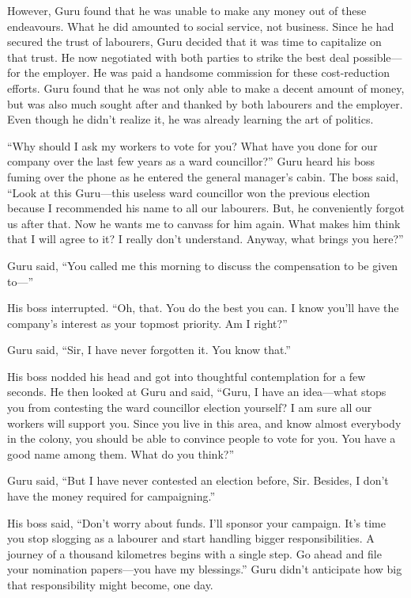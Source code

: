 However, Guru found that he was unable to make any money out of these endeavours.
What he did amounted to social service, not business. Since he had secured the
trust of labourers, Guru decided that it was time to capitalize on that trust. He now
negotiated with both parties to strike the best deal possible—for the
employer. He was paid a handsome commission for these cost-reduction efforts.
Guru found that he was not only able to make a decent amount of money, but was
also much sought after and thanked by both labourers and the employer. Even
though he didn't realize it, he was already learning the art of politics.

“Why should I ask my workers to vote for you? What have you done for our company
over the last few years as a ward councillor?” Guru heard his boss fuming over
the phone as he entered the general manager's cabin. The boss said, “Look at
this Guru—this useless ward councillor won the previous election because I
recommended his name to all our labourers. But, he conveniently forgot us
after that. Now he wants me to canvass for him again. What makes him think that
I will agree to it? I really don't understand. Anyway, what brings you here?”

Guru said, “You called me this morning to discuss the compensation to be
given to—”

His boss interrupted. “Oh, that. You do the best you can. I know you'll have
the company's interest as your topmost priority. Am I right?”

Guru said, “Sir, I have never forgotten it. You know that.”

His boss nodded his head and got into thoughtful contemplation for a few
seconds. He then looked at Guru and said, “Guru, I have an idea—what stops you
from contesting the ward councillor election yourself? I am sure all our workers
will support you. Since you live in this area, and know almost everybody in
the colony, you should be able to convince people to vote for you. You have a
good name among them. What do you think?”

Guru said, “But I have never contested an election before, Sir. Besides, I don't
have the money required for campaigning.”

His boss said, “Don't worry about funds. I'll sponsor your campaign. It's time
you stop slogging as a labourer and start handling bigger responsibilities. A
journey of a thousand kilometres begins with a single step. Go ahead and file your
nomination papers—you have my blessings.” Guru didn't anticipate how big that
responsibility might become, one day.

